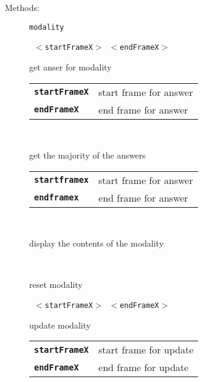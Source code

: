 \begin{description}
\vspace{3mm} \item[Methods:] \texttt{modality}

    \begin{description}
       \texttt{ $<$startFrameX$>$ $<$endFrameX$>$} \

        get anser for modality

      \begin{tabular}{ll}
 \texttt{\textbf{startFrameX}} &  start frame for answer  \\
 \texttt{\textbf{endFrameX}} &    end frame for answer  \\
      \end{tabular}
       \texttt{  } \

        get the majority of the answers

      \begin{tabular}{ll}
 \texttt{\textbf{startframex}} &  start frame for answer  \\
 \texttt{\textbf{endframex}} &    end frame for answer  \\
      \end{tabular}
       \texttt{} \

        display the contents of the modality

       \texttt{} \

        reset modality

       \texttt{ $<$startFrameX$>$ $<$endFrameX$>$} \

        update modality

      \begin{tabular}{ll}
 \texttt{\textbf{startFrameX}} &  start frame for update  \\
 \texttt{\textbf{endFrameX}} &    end frame for update  \\
      \end{tabular}
    \end{description}

\end{description}

